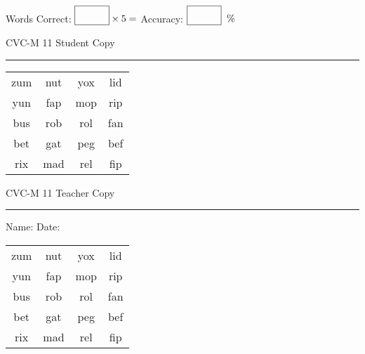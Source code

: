 \documentclass{memoir}
\begin{document}
\small

Words Correct: $\fbox{\phantom{\huge 100}} \times 5 = $ Accuracy: $\fbox{\phantom{\huge 100}}\;\; \%$ 

\vfill

\newpage


\footnotesize \noindent
CVC-M 11 \hfill Student Copy
\smallskip
\hrule

\Large

\setlength{\tabcolsep}{14pt}
\def\arraystretch{2}

{\selectfont


\begin{vplace}[0.5]
\begin{center}
\begin{tabular}{cccc}
zum & nut & yox & lid \\
yun & fap & mop & rip \\
bus & rob & rol & fan \\
bet & gat & peg & bef \\
rix & mad & rel & fip \\
\end{tabular}
\end{center}
\end{vplace}

}

\newpage

\footnotesize \noindent
CVC-M 11 \hfill Teacher Copy
\smallskip
\hrule

\small

\vfill

\noindent
Name: \underline{\hspace{1.75in}} \hfill Date: \underline{\hspace{1in}}

\Large

{\selectfont


\begin{vplace}[0.5]
\begin{center}
\begin{tabular}{cccc}
zum & nut & yox & lid \\
yun & fap & mop & rip \\
bus & rob & rol & fan \\
bet & gat & peg & bef \\
rix & mad & rel & fip \\
\end{tabular}
\end{center}
\end{vplace}



}
\end{document}
